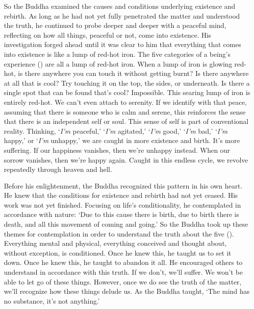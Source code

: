 So the Buddha examined the causes and conditions underlying existence and rebirth. As long as he had not yet fully penetrated the matter and understood the truth, he continued to probe deeper and deeper with a peaceful mind, reflecting on how all things, peaceful or not, come into existence. His investigation forged ahead until it was clear to him that everything that comes into existence is like a lump of red-hot iron. The five categories of a being's experience () are all a lump of red-hot iron. When a lump of iron is glowing red-hot, is there anywhere you can touch it without getting burnt? Is there anywhere at all that is cool? Try touching it on the top, the sides, or underneath. Is there a single spot that can be found that's cool? Impossible. This searing lump of iron is entirely red-hot. We can't even attach to serenity. If we identify with that peace, assuming that there is someone who is calm and serene, this reinforces the sense that there is an independent self or soul. This sense of self is part of conventional reality. Thinking, `\textit{I'm} peaceful,' `\textit{I'm} agitated,' `\textit{I'm} good,' `\textit{I'm} bad,' `\textit{I'm} happy,' or `\textit{I'm} unhappy,' we are caught in more existence and birth. It's more suffering. If our happiness vanishes, then we're unhappy instead. When our sorrow vanishes, then we're happy again. Caught in this endless cycle, we revolve repeatedly through heaven and hell.

Before his enlightenment, the Buddha recognized this pattern in his own heart. He knew that the conditions for existence and rebirth had not yet ceased. His work was not yet finished. Focusing on life's conditionality, he contemplated in accordance with nature: `Due to this cause there is birth, due to birth there is death, and all this movement of coming and going.' So the Buddha took up these themes for contemplation in order to understand the truth about the five (). Everything mental and physical, everything conceived and thought about, without exception, is conditioned. Once he knew this, he taught us to set it down. Once he knew this, he taught to abandon it all. He encouraged others to understand in accordance with this truth. If we don't, we'll suffer. We won't be able to let go of these things. However, once we do see the truth of the matter, we'll recognize how these things delude us. As the Buddha taught, `The mind has no substance, it's not anything.' 

